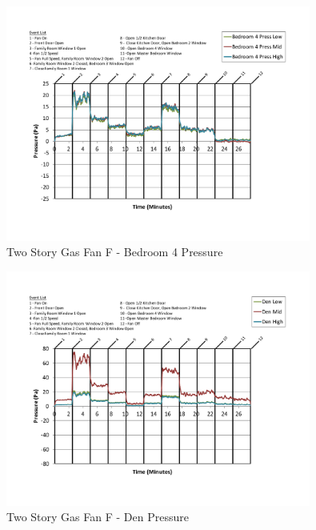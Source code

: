\documentclass{article}
\begin{document}
\begin{appendices}
	\begin{figure}[H]
		\centering
		\includegraphics[height=3.05in,trim=0.67in 1.1in 0.67in 0.8in,clip=true]{0_Images/Results_Charts/ColdFlow/Two_Story/Gas/F/Bedroom_4_Pressure.pdf}
		\caption{Two Story Gas Fan F - Bedroom 4 Pressure}
	\end{figure}
 

	\begin{figure}[H]
		\centering
		\includegraphics[height=3.05in,trim=0.67in 1.1in 0.67in 0.8in,clip=true]{0_Images/Results_Charts/ColdFlow/Two_Story/Gas/F/Den_Pressure.pdf}
		\caption{Two Story Gas Fan F - Den Pressure}
	\end{figure}
 
	\clearpage


\end{appendices}
\end{document}

